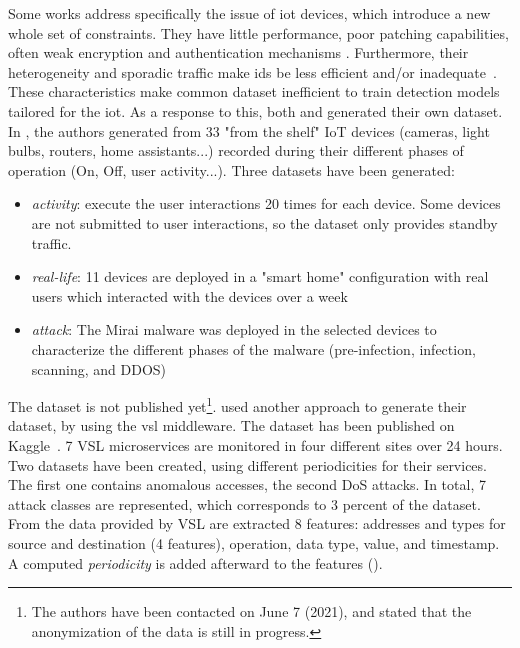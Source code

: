 Some works address specifically the issue of \gls{iot} devices, which introduce a new whole set of constraints.
They have little performance, poor patching capabilities, often weak encryption and authentication mechanisms \cite{Neshenko2019}.
Furthermore, their heterogeneity and sporadic traffic make \gls{ids} be less efficient and/or inadequate~\cite{Chaabouni2019,nguyen_DIoTFederatedSelflearning_2019}.
These characteristics make common dataset inefficient to train detection models tailored for the \gls{iot}.
As a response to this, both \textcite{pahl_AllEyesYou_2018} and \textcite{nguyen_DIoTFederatedSelflearning_2019} generated their own dataset.
In \cite{nguyen_DIoTFederatedSelflearning_2019}, the authors generated from 33 "from the shelf" IoT devices (cameras, light bulbs, routers, home assistants...) recorded during their different phases of operation (On, Off, user activity...).
Three datasets have been generated:
\begin{itemize}
    \item \emph{activity}: execute the user interactions 20 times for each device.
Some devices are not submitted to user interactions, so the dataset only provides standby traffic.
    \item \emph{real-life}: 11 devices are deployed in a "smart home" configuration with real users which interacted with the devices over a week
    \item \emph{attack}: The Mirai malware was deployed in the selected devices to characterize the different phases of the malware (pre-infection, infection, scanning, and DDOS)
\end{itemize}
The dataset is not published yet\footnote{The authors have been contacted on June 7 (2021), and stated that the anonymization of the data is still in progress.}.
\textcite{pahl_AllEyesYou_2018} used another approach to generate their dataset, by using the \gls{vsl} middleware.
The dataset has been published on Kaggle~\cite{ds2os2018}.
7 VSL microservices are monitored in four different sites over 24 hours.
Two datasets have been created, using different periodicities for their services.
The first one contains anomalous accesses, the second DoS attacks.
In total, 7 attack classes are represented, which corresponds to 3 percent of the dataset.
From the data provided by VSL are extracted 8 features: addresses and types for source and destination (4 features), operation, data type, value, and timestamp.
A computed \emph{periodicity} is added afterward to the features ().

